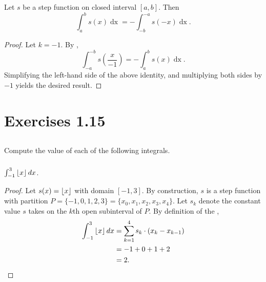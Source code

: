 \documentclass{report}
\begin{document}
\subsection{}%

  \begin{theorem}
    Let $s$ be a step function on closed interval $[a, b]$.
    Then
      $$\int_a^b s(x) \mathop{dx} = -\int_{-b}^{-a} s(-x) \mathop{dx}.$$
  \end{theorem}

  \begin{proof}
    Let $k = -1$.
    By ,
      $$\int_{-a}^{-b} s \left( \frac{x}{-1} \right) =
        -\int_a^b s(x) \mathop{dx}.$$
    Simplifying the left-hand side of the above identity, and multiplying both
      sides by $-1$ yields the desired result.
  \end{proof}

\section{Exercises 1.15}%

\subsection{}%

  Compute the value of each of the following integrals.

\subsubsection{}%

  $\int_{-1}^3 \left\lfloor x\right\rfloor \mathop{dx}$.

  \begin{proof}
    Let $s(x) = \left\lfloor x\right\rfloor$ with domain $[-1, 3]$.
    By construction, $s$ is a step function with partition
      $P = \{-1, 0, 1, 2, 3\} = \{x_0, x_1, x_2, x_3, x_4\}$.
    Let $s_k$ denote the constant value $s$ takes on the $k$th open subinterval of
      $P$.
    By definition of the ,
      \begin{align*}
        \int_{-1}^3 \left\lfloor x\right\rfloor \mathop{dx}
          & = \sum_{k=1}^4 s_k \cdot (x_k - x_{k-1}) \\
          & = -1 + 0 + 1 + 2 \\
          & = 2.
      \end{align*}
  \end{proof}
\end{document}

